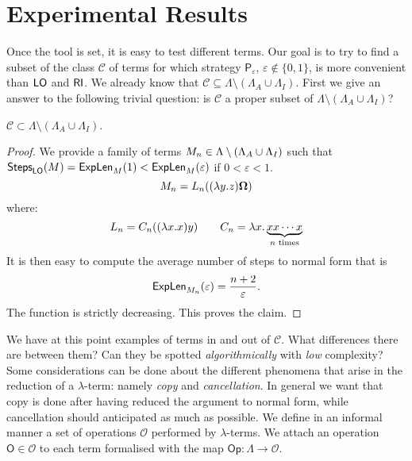 \section{Experimental Results}
Once the tool is set, it is easy to test different terms. Our goal is to try to find a subset of the class $\mathcal{C}$ of terms for which strategy $\mathsf{P}_\varepsilon$, $\varepsilon\not\in\{0,1\}$, is more convenient than $\textsf{LO}$ and $\textsf{RI}$. We already know that $\mathcal{C}\subseteq\Lambda\setminus(\Lambda_A\cup\Lambda_I)$. First we give an answer to the following trivial question: is $\mathcal{C}$ a proper subset of $\Lambda\setminus(\Lambda_A\cup\Lambda_I)$?
\begin{proposition}\label{prop:strict}
	$\mathcal{C}\subset\Lambda\setminus(\Lambda_A\cup\Lambda_I)$.
\end{proposition}
\begin{proof}
	We provide a family of terms $M_n\in\Lambda\setminus(\Lambda_A\cup\Lambda_I)$ such that $\textsf{Steps}_{\textsf{LO}}(M)=\textsf{ExpLen}_{M}(1)<\textsf{ExpLen}_{M}(\varepsilon)$ if $0<\varepsilon<1$.
	$$
	M_n=L_n((\lambda y.z)\bm{\Omega})
	$$
	where:
	$$
	L_n = C_n((\lambda x.x)y)\qquad
	C_n = \lambda  x.\underbrace{xx\cdots x}_{n\text{ times}}
	$$
	It is then easy to compute the average number of steps to normal form that is
	$$
	\textsf{ExpLen}_{M_n}(\varepsilon)=\frac{n+2}{\varepsilon}.
	$$ 
	The function is strictly decreasing. This proves the claim.
\end{proof}
We have at this point examples of terms in and out of $\mathcal{C}$. What differences there are between them? Can they be spotted \emph{algorithmically} with \emph{low} complexity? Some considerations can be done about the different phenomena that arise in the reduction of a $\lambda$-term: namely \emph{copy} and \emph{cancellation}. In general we want that copy is done after having reduced the argument to normal form, while cancellation should anticipated as much as possible. We define in an informal manner a set of operations $\mathcal{O}$ performed by $\lambda$-terms. We attach an operation $\mathsf{O}\in\mathcal{O}$ to each term formalised with the map $\mathsf{Op}:\Lambda\rightarrow\mathcal{O}$.
